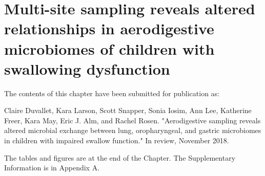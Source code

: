
\graphicspath{{aspiration/figures/}}

\chapter{Multi-site sampling reveals altered relationships in aerodigestive microbiomes of children with swallowing dysfunction}

The contents of this chapter have been submitted for publication as:

Claire Duvallet, Kara Larson, Scott Snapper, Sonia Iosim, Ann Lee, Katherine Freer, Kara May, Eric J. Alm, and Rachel Rosen. "Aerodigestive sampling reveals altered microbial exchange between lung, oropharyngeal, and gastric microbiomes in children with impaired swallow function." In review, November 2018.

The tables and figures are at the end of the Chapter. The Supplementary Information is in Appendix A.

\clearpage

